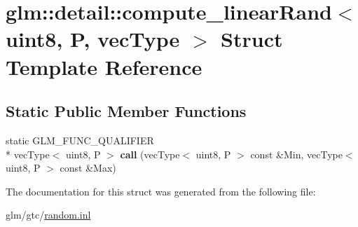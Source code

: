 \hypertarget{structglm_1_1detail_1_1compute__linearRand_3_01uint8_00_01P_00_01vecType_01_4}{\section{glm\-:\-:detail\-:\-:compute\-\_\-linear\-Rand$<$ uint8, P, vec\-Type $>$ Struct Template Reference}
\label{structglm_1_1detail_1_1compute__linearRand_3_01uint8_00_01P_00_01vecType_01_4}
}
\subsection*{Static Public Member Functions}
\begin{DoxyCompactItemize}
\item 
\hypertarget{structglm_1_1detail_1_1compute__linearRand_3_01uint8_00_01P_00_01vecType_01_4_aee2b1e5fe6b54c1765ba8051bcd37cfe}{static G\-L\-M\-\_\-\-F\-U\-N\-C\-\_\-\-Q\-U\-A\-L\-I\-F\-I\-E\-R \\*
vec\-Type$<$ uint8, P $>$ {\bfseries call} (vec\-Type$<$ uint8, P $>$ const \&Min, vec\-Type$<$ uint8, P $>$ const \&Max)}\label{structglm_1_1detail_1_1compute__linearRand_3_01uint8_00_01P_00_01vecType_01_4_aee2b1e5fe6b54c1765ba8051bcd37cfe}

\end{DoxyCompactItemize}


The documentation for this struct was generated from the following file\-:\begin{DoxyCompactItemize}
\item 
glm/gtc/\hyperlink{random_8inl}{random.\-inl}\end{DoxyCompactItemize}
